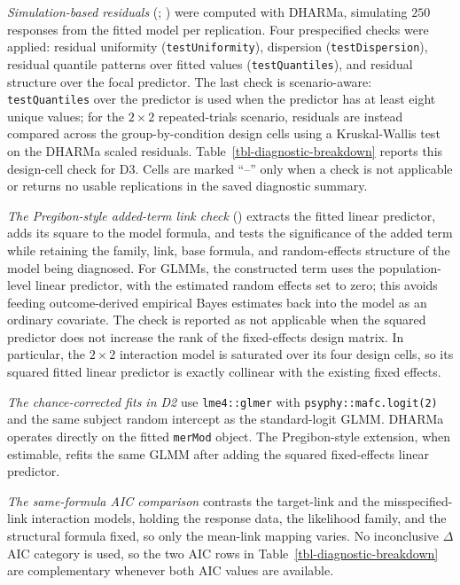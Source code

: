 \documentclass[
  man,
  floatsintext,
  longtable,
  nolmodern,
  notxfonts,
  notimes,
  colorlinks=true,linkcolor=blue,citecolor=blue,urlcolor=blue]{apa7}
\begin{document}
\emph{Simulation-based residuals} (; ) were computed
with DHARMa, simulating \(250\) responses from the fitted model per
replication. Four prespecified checks were applied: residual uniformity
(\texttt{testUniformity}), dispersion (\texttt{testDispersion}),
residual quantile patterns over fitted values (\texttt{testQuantiles}),
and residual structure over the focal predictor. The last check is
scenario-aware: \texttt{testQuantiles} over the predictor is used when
the predictor has at least eight unique values; for the \(2 \times 2\)
repeated-trials scenario, residuals are instead compared across the
group-by-condition design cells using a Kruskal-Wallis test on the
DHARMa scaled residuals. Table~\ref{tbl-diagnostic-breakdown} reports
this design-cell check for D3. Cells are marked ``--'' only when a check
is not applicable or returns no usable replications in the saved
diagnostic summary.

\emph{The Pregibon-style added-term link check}
() extracts the fitted linear
predictor, adds its square to the model formula, and tests the
significance of the added term while retaining the family, link, base
formula, and random-effects structure of the model being diagnosed. For
GLMMs, the constructed term uses the population-level linear predictor,
with the estimated random effects set to zero; this avoids feeding
outcome-derived empirical Bayes estimates back into the model as an
ordinary covariate. The check is reported as not applicable when the
squared predictor does not increase the rank of the fixed-effects design
matrix. In particular, the \(2 \times 2\) interaction model is saturated
over its four design cells, so its squared fitted linear predictor is
exactly collinear with the existing fixed effects.

\emph{The chance-corrected fits in D2} use \texttt{lme4::glmer} with
\texttt{psyphy::mafc.logit(2)} and the same subject random intercept as
the standard-logit GLMM. DHARMa operates directly on the fitted
\texttt{merMod} object. The Pregibon-style extension, when estimable,
refits the same GLMM after adding the squared fixed-effects linear
predictor.

\emph{The same-formula AIC comparison} contrasts the target-link and the
misspecified-link interaction models, holding the response data, the
likelihood family, and the structural formula fixed, so only the
mean-link mapping varies. No inconclusive \(\Delta\)AIC category is
used, so the two AIC rows in Table~\ref{tbl-diagnostic-breakdown} are
complementary whenever both AIC values are available.
\end{document}

